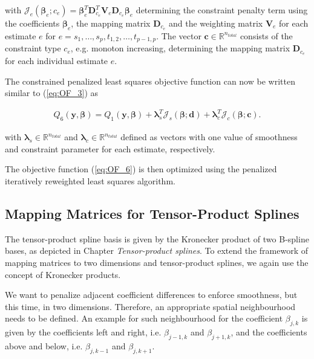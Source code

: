 \documentclass[10pt,a4paper]{article}
\begin{document}
	with $\mathcal J_e(\boldsymbol{\beta}_e; c_e) = \boldsymbol{\beta}_e^T \boldsymbol{D}_{c_e}^T \boldsymbol{V}_e \boldsymbol{D}_{c_e} \boldsymbol{\beta}_e$ determining the constraint penalty term using the coefficients $\boldsymbol{\beta}_e$, the mapping matrix $\boldsymbol{D}_{c_e}$ and the weighting matrix $\boldsymbol{V}_e$ for each estimate $e$ for $e=s_1, \dots, s_p, t_{1,2}, \dots, t_{p-1,p}$. The vector $\boldsymbol{c} \in \mathbb{R}^{n_{total}}$ consists of the constraint type $c_e$, e.g. monoton increasing, determining the mapping matrix $\boldsymbol{D}_{c_e}$ for each individual estimate $e$. 
	
	The constrained penalized least squares objective function can now be written similar to (\ref{eq:OF_3}) as
	
	\begin{align}\label{eq:OF_6}
		Q_6(\boldsymbol{y}, \boldsymbol{\beta}) = Q_1(\boldsymbol{y}, \boldsymbol{\beta}) + \boldsymbol{\lambda}_s^T	\boldsymbol{\mathcal{J}}_s(\boldsymbol{\beta}; \boldsymbol{d}) + \boldsymbol{\lambda}_c^T \boldsymbol{\mathcal{J}}_c(\boldsymbol{\beta}; \boldsymbol{c}).
	\end{align}
	
	with $\boldsymbol{\lambda}_s \in \mathbb{R}^{n_{total}}$ and  $\boldsymbol{\lambda}_c \in \mathbb{R}^{n_{total}}$  defined as vectors with one value of smoothness and constraint parameter for each estimate, respectively. 
	
	The objective function (\ref{eq:OF_6}) is then optimized using the penalized iteratively reweighted least squares algorithm. 

	\subsection{Mapping Matrices for Tensor-Product Splines}
	
	The tensor-product spline basis is given by the Kronecker product of two B-spline bases, as depicted in Chapter \emph{Tensor-product splines}. To extend the framework of mapping matrices to two dimensions and tensor-product splines, we again use the concept of Kronecker products. 
	
	We want to penalize adjacent coefficient differences to enforce smoothness, but this time, in two dimensions. Therefore, an appropriate spatial neighbourhood needs to be defined. An example for such neighbourhood for the coefficient $\beta_{j, k}$ is given by the coefficients left and right, i.e. $\beta_{j-1, k}$ and $\beta_{j+1, k}$, and the coefficients above and below, i.e. $\beta_{j, k-1}$ and $\beta_{j,k+1}$. 
	
\end{document}
